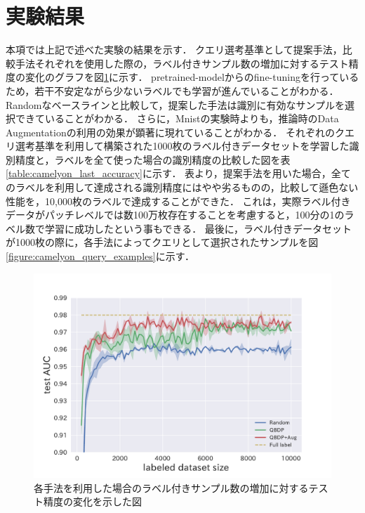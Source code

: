 \section{実験結果}
本項では上記で述べた実験の結果を示す．
クエリ選考基準として提案手法，比較手法それぞれを使用した際の，ラベル付きサンプル数の増加に対するテスト精度の変化のグラフを図\ref{fig:camelyon_acc_graph}に示す．
pretrained-modelからのfine-tuningを行っているため，若干不安定ながら少ないラベルでも学習が進んでいることがわかる．
Randomなベースラインと比較して，提案した手法は識別に有効なサンプルを選択できていることがわかる．
さらに，Mnistの実験時よりも，推論時のData Augmentationの利用の効果が顕著に現れていることがわかる．
それぞれのクエリ選考基準を利用して構築された1000枚のラベル付きデータセットを学習した識別精度と，ラベルを全て使った場合の識別精度の比較した図を表\ref{table:camelyon_last_accuracy}に示す．
表より，提案手法を用いた場合，全てのラベルを利用して達成される識別精度にはやや劣るものの，比較して遜色ない性能を，10,000枚のラベルで達成することができた．
これは，実際ラベル付きデータがパッチレベルでは数100万枚存在することを考慮すると，100分の1のラベル数で学習に成功したという事もできる．
最後に，ラベル付きデータセットが1000枚の際に，各手法によってクエリとして選択されたサンプルを図\ref{figure:camelyon_query_examples}に示す．

\begin{figure}[tbp]
     \begin{center}
      \includegraphics[width=12cm]{figures/camelyon_acc_graph.pdf}
     \end{center}
    \label{fig:camelyon_acc_graph}
    \caption{各手法を利用した場合のラベル付きサンプル数の増加に対するテスト精度の変化を示した図}
\end{figure}

